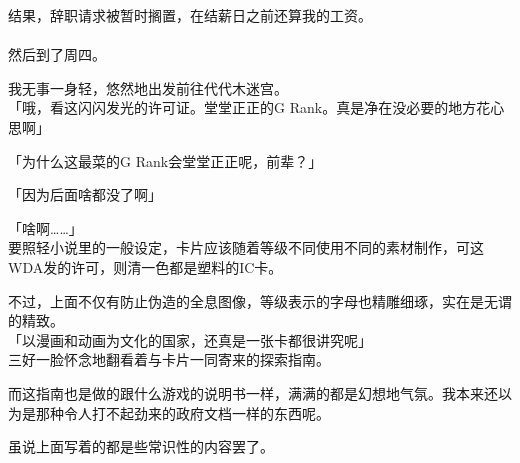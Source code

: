 结果，辞职请求被暂时搁置，在结薪日之前还算我的工资。\\

\sqsplit\\

然后到了周四。

我无事一身轻，悠然地出发前往代代木迷宫。\\

「哦，看这闪闪发光的许可证。堂堂正正的G Rank。真是净在没必要的地方花心思啊」

「为什么这最菜的G Rank会堂堂正正呢，前辈？」

「因为后面啥都没了啊」

「啥啊……」\\

要照轻小说里的一般设定，卡片应该随着等级不同使用不同的素材制作，可这WDA发的许可，则清一色都是塑料的IC卡。

不过，上面不仅有防止伪造的全息图像，等级表示的字母也精雕细琢，实在是无谓的精致。\\

「以漫画和动画为文化的国家，还真是一张卡都很讲究呢」\\

三好一脸怀念地翻看着与卡片一同寄来的探索指南。

而这指南也是做的跟什么游戏的说明书一样，满满的都是幻想地气氛。我本来还以为是那种令人打不起劲来的政府文档一样的东西呢。

虽说上面写着的都是些常识性的内容罢了。\\

